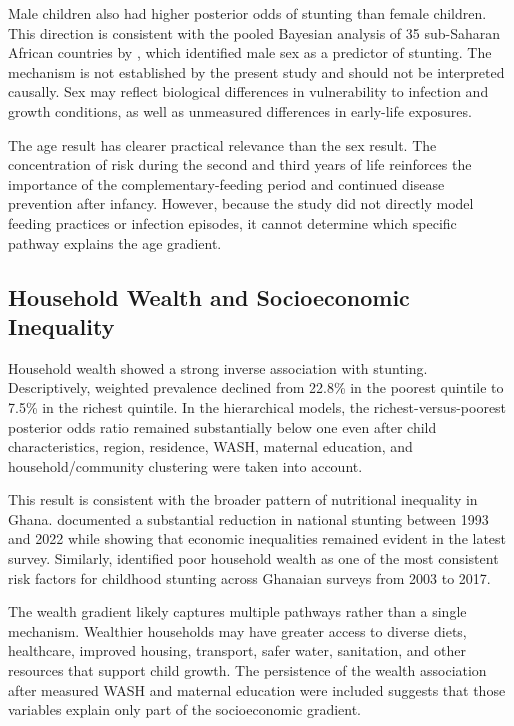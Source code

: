 Male children also had higher posterior odds of stunting than female children. This direction is consistent with the pooled Bayesian analysis of 35 sub-Saharan African countries by \citet{TakeleEtAl2022}, which identified male sex as a predictor of stunting. The mechanism is not established by the present study and should not be interpreted causally. Sex may reflect biological differences in vulnerability to infection and growth conditions, as well as unmeasured differences in early-life exposures.

The age result has clearer practical relevance than the sex result. The concentration of risk during the second and third years of life reinforces the importance of the complementary-feeding period and continued disease prevention after infancy. However, because the study did not directly model feeding practices or infection episodes, it cannot determine which specific pathway explains the age gradient.

\subsection{Household Wealth and Socioeconomic Inequality}

Household wealth showed a strong inverse association with stunting. Descriptively, weighted prevalence declined from 22.8\% in the poorest quintile to 7.5\% in the richest quintile. In the hierarchical models, the richest-versus-poorest posterior odds ratio remained substantially below one even after child characteristics, region, residence, WASH, maternal education, and household/community clustering were taken into account.

This result is consistent with the broader pattern of nutritional inequality in Ghana. \citet{OsborneEtAl2025} documented a substantial reduction in national stunting between 1993 and 2022 while showing that economic inequalities remained evident in the latest survey. Similarly, \citet{SeworJayalakshmi2024} identified poor household wealth as one of the most consistent risk factors for childhood stunting across Ghanaian surveys from 2003 to 2017.

The wealth gradient likely captures multiple pathways rather than a single mechanism. Wealthier households may have greater access to diverse diets, healthcare, improved housing, transport, safer water, sanitation, and other resources that support child growth. The persistence of the wealth association after measured WASH and maternal education were included suggests that those variables explain only part of the socioeconomic gradient.

